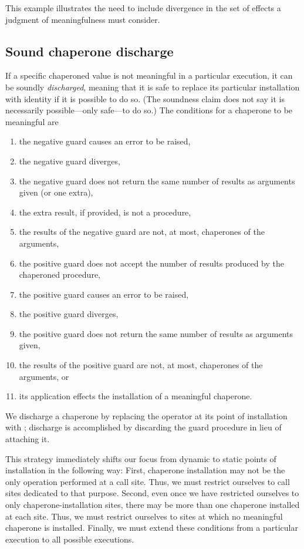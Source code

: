 This example illustrates the need to include divergence in the set of effects a judgment of meaningfulness must consider.

\subsection{Sound chaperone discharge}

If a specific chaperoned value is not meaningful in a particular execution, it can be soundly \emph{discharged}, meaning that it is safe to replace its particular installation with identity if it is possible to do so.
(The soundness claim does not say it is necessarily possible---only safe---to do so.)
The conditions for a chaperone to be meaningful are
\begin{enumerate}
\item the negative guard causes an error to be raised,
\item \label{con:neg-divergence} the negative guard diverges,
\item the negative guard does not return the same number of results as arguments given (or one extra),
\item the extra result, if provided, is not a procedure,
\item the results of the negative guard are not, at most, chaperones of the arguments,
\item the positive guard does not accept the number of results produced by the chaperoned procedure,
\item the positive guard causes an error to be raised,
\item the positive guard diverges,
\item the positive guard does not return the same number of results as arguments given,
\item the results of the positive guard are not, at most, chaperones of the arguments, or
\item its application effects the installation of a meaningful chaperone.
\end{enumerate}







We discharge a chaperone by replacing the operator at its point of installation with ; discharge is accomplished by discarding the guard procedure in lieu of attaching it.

This strategy immediately shifts our focus from dynamic to static points of installation in the following way:
First, chaperone installation may not be the only operation performed at a call site.
Thus, we must restrict ourselves to call sites dedicated to that purpose.
Second, even once we have restricted ourselves to only chaperone-installation sites, there may be more than one chaperone installed at each site.
Thus, we must restrict ourselves to sites at which no meaningful chaperone is installed.
Finally, we must extend these conditions from a particular execution to all possible executions.

